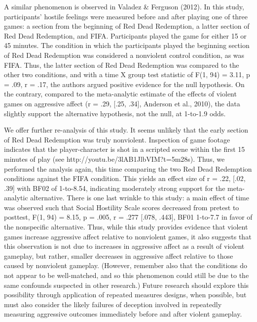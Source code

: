 \documentclass{article}
\begin{document}
A similar phenomenon is observed in Valadez \& Ferguson (2012). In this study, participants’ hostile feelings were measured before and after playing one of three games: a section from the beginning of Red Dead Redemption, a latter section of Red Dead Redemption, and FIFA. Participants played the game for either 15 or 45 minutes. The condition in which the participants played the beginning section of Red Dead Redemption was considered a nonviolent control condition, as was FIFA. Thus, the latter section of Red Dead Redemption was compared to the other two conditions, and with a time X group test statistic of F(1, 94) = 3.11, p = .09, r = .17, the authors argued positive evidence for the null hypothesis. On the contrary, compared to the meta-analytic estimate of the effects of violent games on aggressive affect (r = .29, [.25, .34], Anderson et al., 2010), the data slightly support the alternative hypothesis, not the null, at 1-to-1.9 odds. 

We offer further re-analysis of this study. It seems unlikely that the early section of Red Dead Redemption was truly nonviolent. Inspection of game footage indicates that the player-character is shot in a scripted scene within the first 15 minutes of play (see http://youtu.be/3lAB1JlbVIM?t=5m28s). Thus, we performed the analysis again, this time comparing the two Red Dead Redemption conditions against the FIFA condition. This yields an effect size of r = .22, [.02, .39]  with  BF02 of 1-to-8.54, indicating moderately strong support for the meta-analytic alternative. There is one last wrinkle to this study: a main effect of time was observed such that Social Hostility Scale scores decreased from pretest to posttest, F(1, 94) = 8.15, p = .005, r = .277 [.078, .443], BF01 1-to-7.7 in favor of the nonspecific alternative. Thus, while this study provides evidence that violent games increase aggressive affect relative to nonviolent games, it also suggests that this observation is not due to increases in aggressive affect as a result of violent gameplay, but rather, smaller decreases in aggressive affect relative to those caused by nonviolent gameplay. (However, remember also that the conditions do not appear to be well-matched, and so this phenomenon could still be due to the same confounds suspected in other research.) Future research should explore this possibility through application of repeated measures designs, when possible, but must also consider the likely failures of deception involved in repeatedly measuring aggressive outcomes immediately before and after violent gameplay.
\end{document}
